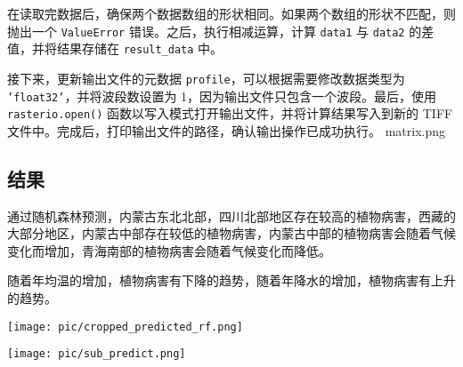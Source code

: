 \documentclass{article}
\begin{document}
在读取完数据后，确保两个数据数组的形状相同。如果两个数组的形状不匹配，则抛出一个 \texttt{ValueError} 错误。之后，执行相减运算，计算 \texttt{data1} 与 \texttt{data2} 的差值，并将结果存储在 \texttt{result\_data} 中。

接下来，更新输出文件的元数据 \texttt{profile}，可以根据需要修改数据类型为 \texttt{'float32'}，并将波段数设置为 1，因为输出文件只包含一个波段。最后，使用 \texttt{rasterio.open()} 函数以写入模式打开输出文件，并将计算结果写入到新的 TIFF 文件中。完成后，打印输出文件的路径，确认输出操作已成功执行。
matrix.png

\subsection{结果}
通过随机森林预测，内蒙古东北北部，四川北部地区存在较高的植物病害，西藏的大部分地区，内蒙古中部存在较低的植物病害，内蒙古中部的植物病害会随着气候变化而增加，青海南部的植物病害会随着气候变化而降低。

随着年均温的增加，植物病害有下降的趋势，随着年降水的增加，植物病害有上升的趋势。

\par
\texttt{[image: pic/cropped\_predicted\_rf.png]} %
\par
\texttt{[image: pic/sub\_predict.png]} %
\end{document}
